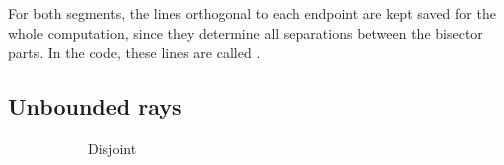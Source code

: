 \documentclass[11pt,a4paper,english]{article}
\begin{document}
	For both segments, the lines orthogonal to each endpoint are kept saved for the whole computation, since they determine all separations between the bisector parts. In the code, these lines are called .
	
	
	\subsection{Unbounded rays}
	\begin{figure}[h]
	\begin{subfigure}[b]{0.3\textwidth}
    	\caption{Disjoint \label{fig:two_unbounded_rays}}
	\end{subfigure}
	\qquad
	\begin{subfigure}[b]{0.3\textwidth}

\end{subfigure}
\end{figure}
\end{document}
